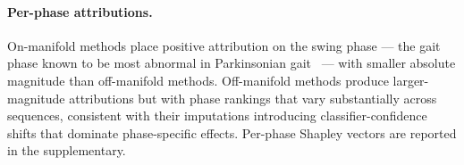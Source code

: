 \paragraph{Per-phase attributions.}
On-manifold methods place positive attribution on the swing phase ---
the gait phase known to be most abnormal in Parkinsonian gait~\citep{morris1994ability}
--- with smaller absolute magnitude than off-manifold methods.  Off-manifold
methods produce larger-magnitude attributions but with phase rankings that
vary substantially across sequences, consistent with their imputations
introducing classifier-confidence shifts that dominate phase-specific
effects.  Per-phase Shapley vectors are reported in the supplementary.
